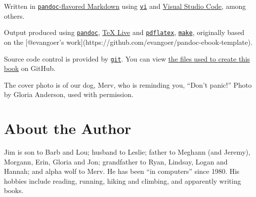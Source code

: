 \documentclass[10pt,]{book}
\numberwithin{figure}{chapter}
\begin{document}
Written in
\href{http://pandoc.org/README.html\#pandocs-markdown}{\texttt{pandoc}-flavored
Markdown} using \href{http://linux.die.net/man/1/vi}{\texttt{vi}} and
\href{https://github.com/Microsoft/vscode}{Visual Studio Code}, among
others.

Output produced using \href{http://pandoc.org/}{\texttt{pandoc}},
\href{http://www.tug.org/texlive/}{TeX Live} and
\href{http://linux.die.net/man/1/pdflatex}{\texttt{pdflatex}},
\href{http://linux.die.net/man/1/make}{\texttt{make}}, originally based
on the {[}@evangoer's
work{]}(https://github.com/evangoer/pandoc-ebook-template).

Source code control is provided by
\href{http://linux.die.net/man/1/git}{\texttt{git}}. You can view
\href{https://github.com/dullroar/ten-steps-to-linux-survival}{the files
used to create this book} on GitHub.

The cover photo is of our dog, Merv, who is reminding you, ``Don't
panic!'' Photo by Gloria Anderson, used with permission.

\section{About the Author}\label{about-the-author}

Jim is son to Barb and Lou; husband to Leslie; father to Meghann (and
Jeremy), Morgann, Erin, Gloria and Jon; grandfather to Ryan, Lindsay,
Logan and Hannah; and alpha wolf to Merv. He has been ``in computers''
since 1980. His hobbies include reading, running, hiking and climbing,
and apparently writing books.



\cleardoublepage
{}
\printindex
\end{document}
